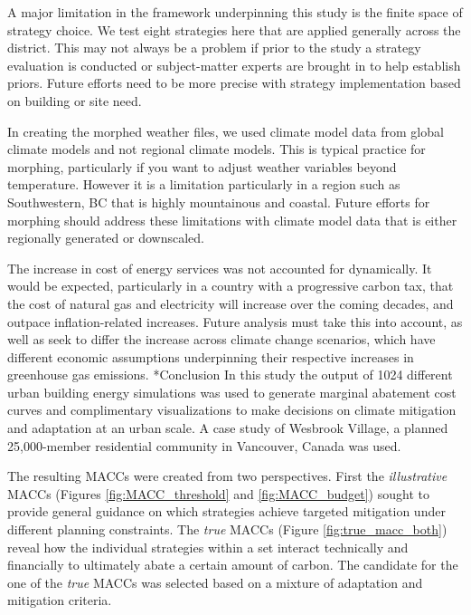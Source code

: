\documentclass[twocolumn, a4paper,10pt]{article}
\makeatletter
\renewcommand\section{\@startsection{section}{1}{\z@}{3pt}{3pt}{\normalfont\large\bfseries}}
\makeatother
\begin{document}
A major limitation in the framework underpinning this study is the finite space of strategy choice. We test eight strategies here that are applied generally across the district. This may not always be a problem if prior to the study a strategy evaluation is conducted or subject-matter experts are brought in to help establish priors. Future efforts need to be more precise with strategy implementation based on building or site need. 

In creating the morphed weather files, we used climate model data from global climate models and not regional climate models. This is typical practice for morphing, particularly if you want to adjust weather variables beyond temperature. However it is a limitation particularly in a region such as Southwestern, BC that is highly mountainous and coastal. Future efforts for morphing should address these limitations with climate model data that is either regionally generated or downscaled.

The increase in cost of energy services was not accounted for dynamically. It would be expected, particularly in a country with a progressive carbon tax, that the cost of natural gas and electricity will increase over the coming decades, and outpace inflation-related increases. Future analysis must take this into account, as well as seek to differ the increase across climate change scenarios, which have different economic assumptions underpinning their respective increases in greenhouse gas emissions.
\section*{Conclusion}
In this study the output of 1024 different urban building energy simulations was used to generate marginal abatement cost curves and complimentary visualizations to make decisions on climate mitigation and adaptation at an urban scale. A case study of Wesbrook Village, a planned 25,000-member residential community in Vancouver, Canada was used.

The resulting MACCs were created from two perspectives. First the \textit{illustrative} MACCs (Figures \ref{fig:MACC_threshold} and \ref{fig:MACC_budget}) sought to provide general guidance on which strategies achieve targeted mitigation under different planning constraints. The \textit{true} MACCs (Figure \ref{fig:true_macc_both}) reveal how the individual strategies within a set interact technically and financially to ultimately abate a certain amount of carbon. The candidate for the one of the \textit{true} MACCs was selected based on a mixture of adaptation and mitigation criteria. 
\end{document}
